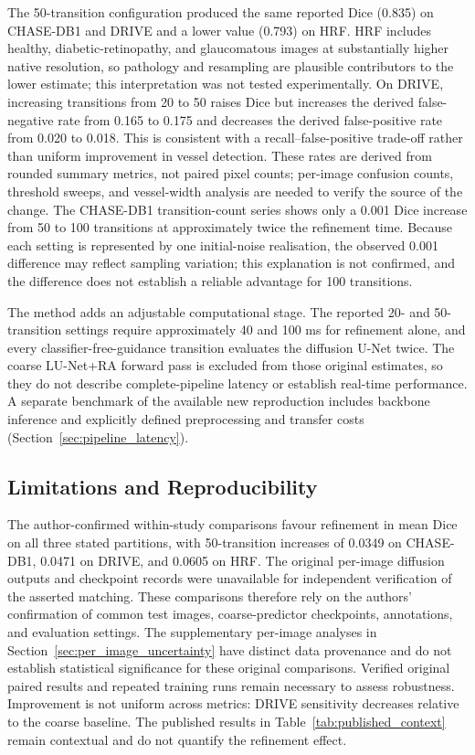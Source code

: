 \documentclass[jimaging,article,submit,pdftex,moreauthors]
  {Definitions/mdpi}
\begin{document}
The 50-transition configuration produced the same reported Dice (0.835) on CHASE-DB1 and DRIVE and a lower value (0.793) on HRF. HRF includes healthy, diabetic-retinopathy, and glaucomatous images at substantially higher native resolution, so pathology and resampling are plausible contributors to the lower estimate; this interpretation was not tested experimentally. On DRIVE, increasing transitions from 20 to 50 raises Dice but increases the derived false-negative rate from 0.165 to 0.175 and decreases the derived false-positive rate from 0.020 to 0.018. This is consistent with a recall--false-positive trade-off rather than uniform improvement in vessel detection. These rates are derived from rounded summary metrics, not paired pixel counts; per-image confusion counts, threshold sweeps, and vessel-width analysis are needed to verify the source of the change. The CHASE-DB1 transition-count series shows only a 0.001 Dice increase from 50 to 100 transitions at approximately twice the refinement time. Because each setting is represented by one initial-noise realisation, the observed 0.001 difference may reflect sampling variation; this explanation is not confirmed, and the difference does not establish a reliable advantage for 100 transitions.

The method adds an adjustable computational stage. The reported 20- and 50-transition settings require approximately 40 and 100 ms for refinement alone, and every classifier-free-guidance transition evaluates the diffusion U-Net twice. The coarse LU-Net+RA forward pass is excluded from those original estimates, so they do not describe complete-pipeline latency or establish real-time performance. A separate benchmark of the available new reproduction includes backbone inference and explicitly defined preprocessing and transfer costs (Section~\ref{sec:pipeline_latency}).

\subsection{Limitations and Reproducibility}
\label{sec:limitations}

The author-confirmed within-study comparisons favour refinement in mean Dice on all three stated partitions, with 50-transition increases of 0.0349 on CHASE-DB1, 0.0471 on DRIVE, and 0.0605 on HRF. The original per-image diffusion outputs and checkpoint records were unavailable for independent verification of the asserted matching. These comparisons therefore rely on the authors' confirmation of common test images, coarse-predictor checkpoints, annotations, and evaluation settings. The supplementary per-image analyses in Section~\ref{sec:per_image_uncertainty} have distinct data provenance and do not establish statistical significance for these original comparisons. Verified original paired results and repeated training runs remain necessary to assess robustness. Improvement is not uniform across metrics: DRIVE sensitivity decreases relative to the coarse baseline. The published results in Table~\ref{tab:published_context} remain contextual and do not quantify the refinement effect.
\end{document}
